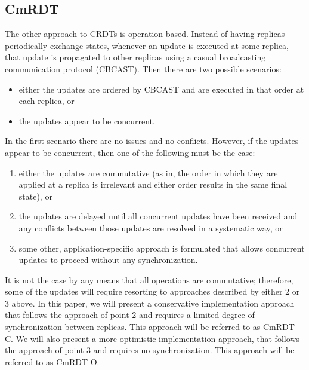 \documentclass[sigconf,nonacm,10pt]{acmart}
\begin{document}
\subsection{CmRDT}
The other approach to CRDTs is operation-based. Instead of having replicas periodically exchange states, whenever an update is executed at some replica, that update is propagated to other replicas using a casual broadcasting communication protocol (CBCAST). Then there are two possible scenarios:
\begin{itemize}
 \item either the updates are ordered by CBCAST and are executed in that order at each replica, or
 \item the updates appear to be concurrent.
\end{itemize}

In the first scenario there are no issues and no conflicts. However, if the updates appear to be concurrent, then one of the following must be the case:
\begin{enumerate}
 \item either the updates are commutative (as in, the order in which they are applied at a replica is irrelevant and either order results in the same final state), or
 \item the updates are delayed until all concurrent updates have been received and any conflicts between those updates are resolved in a systematic way, or
 \item some other, application-specific approach is formulated that allows concurrent updates to proceed without any synchronization.
\end{enumerate}

It is not the case by any means that all operations are commutative; therefore, some of the updates will require resorting to approaches described by either 2 or 3 above. In this paper, we will present a conservative implementation approach that follows the approach of point 2 and requires a limited degree of synchronization between replicas. This approach will be referred to as CmRDT-C. We will also present a more optimistic implementation approach, that follows the approach of point 3 and requires no synchronization. This approach will be referred to as CmRDT-O.
\end{document}
